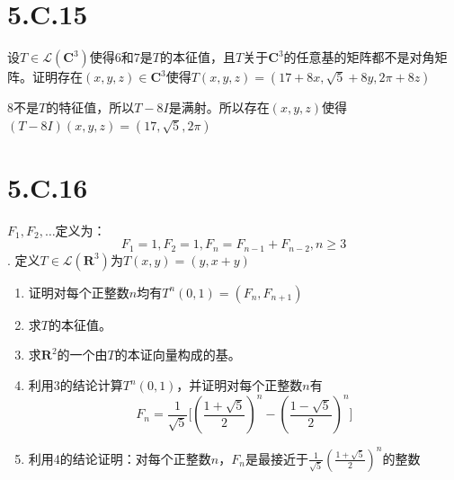 \documentclass[10pt,a4paper,UTF8]{article}
\begin{document}
\section{5.C.15}
\label{sec:org578fc7a}


\begin{problem}
设\(T\in \mathcal{L}(\mathbf{C}^{3})\)使得\(6\)和\(7\)是\(T\)的本征值，且\(T\)关于\(\mathbf{C}^{3}\)的任意基的矩阵都不是对角矩阵。证明存在\((x,y,z)\in \mathbf{C}^{3}\)使得\(T(x,y,z) = (17 + 8x, \sqrt{5} + 8y, 2\pi + 8z)\)
\end{problem}

\begin{answer}
\(8\)不是\(T\)的特征值，所以\(T-8I\)是满射。所以存在\((x,y,z)\)使得\((T-8I)(x,y,z) = (17,\sqrt{5}, 2\pi)\)
\end{answer}
\section{5.C.16}
\label{sec:org8b621b0}


\begin{problem}
\(F_{1},F_{2},\ldots\)定义为：
\[F_{1} = 1,F_{2} = 1,F_{n} = F_{n-1} + F_{n-2}, n\geq 3\]. 定义\(T\in \mathcal{L}(\mathbf{R}^{3})\)为\(T(x,y) = (y,x+y)\)
\begin{enumerate}
\item 证明对每个正整数\(n\)均有\(T^{n}(0,1) = (F_{n},F_{n+1})\)
\item 求\(T\)的本征值。
\item 求\(\mathbf{R}^{2}\)的一个由\(T\)的本证向量构成的基。
\item 利用3的结论计算\(T^{n}(0,1)\)，并证明对每个正整数\(n\)有\[F_{n} = \frac{1}{\sqrt{5}} \bigg[ (\frac{1+\sqrt{5}}{2})^{n} - (\frac{1-\sqrt{5}}{2})^{n}  \bigg]\]
\item 利用4的结论证明：对每个正整数\(n\)，\(F_{n}\)是最接近于\(\frac{1}{\sqrt{5}} (\frac{1+\sqrt{5}}{2})^{n}\)的整数
\end{enumerate}
\end{problem}
\end{document}
